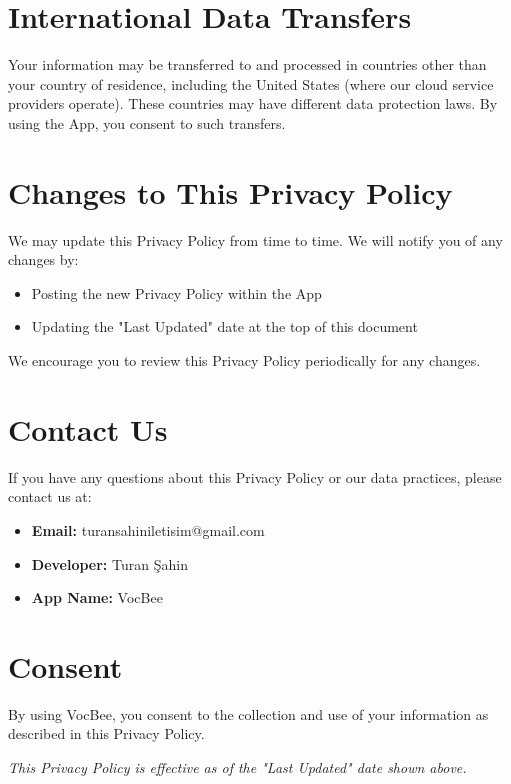 \documentclass[11pt,a4paper]{article}
\begin{document}
\section{International Data Transfers}

Your information may be transferred to and processed in countries other than your country of residence, including the United States (where our cloud service providers operate). These countries may have different data protection laws. By using the App, you consent to such transfers.

\section{Changes to This Privacy Policy}

We may update this Privacy Policy from time to time. We will notify you of any changes by:
\begin{itemize}[leftmargin=2em]
    \item Posting the new Privacy Policy within the App
    \item Updating the "Last Updated" date at the top of this document
\end{itemize}

We encourage you to review this Privacy Policy periodically for any changes.

\section{Contact Us}

If you have any questions about this Privacy Policy or our data practices, please contact us at:

\begin{itemize}[leftmargin=2em]
    \item \textbf{Email:} turansahiniletisim@gmail.com
    \item \textbf{Developer:} Turan Şahin
    \item \textbf{App Name:} VocBee
\end{itemize}

\section{Consent}

By using VocBee, you consent to the collection and use of your information as described in this Privacy Policy.

\vspace{2em}

\begin{center}
    \textit{This Privacy Policy is effective as of the "Last Updated" date shown above.}
\end{center}
\end{document}
